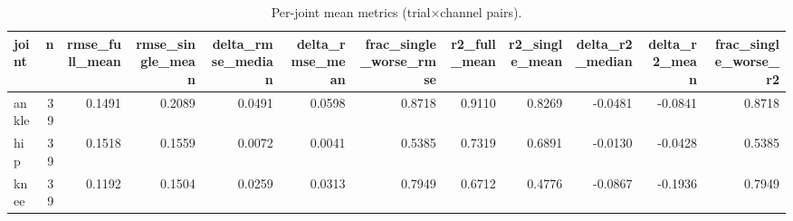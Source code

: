 \begin{table}
\caption{Per-joint mean metrics (trial×channel pairs).}
\label{tab:table1_summary_by_joint}
\begin{tabular}{lrrrrrrrrrrr}
\toprule
joint & n & rmse_full_mean & rmse_single_mean & delta_rmse_median & delta_rmse_mean & frac_single_worse_rmse & r2_full_mean & r2_single_mean & delta_r2_median & delta_r2_mean & frac_single_worse_r2 \\
\midrule
ankle & 39 & 0.1491 & 0.2089 & 0.0491 & 0.0598 & 0.8718 & 0.9110 & 0.8269 & -0.0481 & -0.0841 & 0.8718 \\
hip & 39 & 0.1518 & 0.1559 & 0.0072 & 0.0041 & 0.5385 & 0.7319 & 0.6891 & -0.0130 & -0.0428 & 0.5385 \\
knee & 39 & 0.1192 & 0.1504 & 0.0259 & 0.0313 & 0.7949 & 0.6712 & 0.4776 & -0.0867 & -0.1936 & 0.7949 \\
\bottomrule
\end{tabular}
\end{table}
